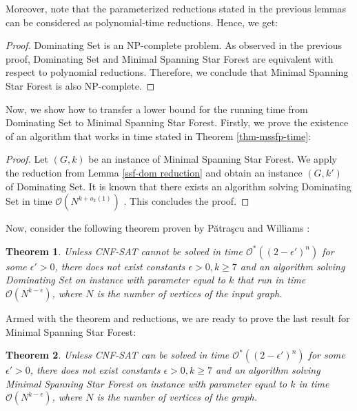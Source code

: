 \documentclass[en]{pracamgr}
\newtheorem{theorem}{Theorem}
\theoremstyle{definition}
\newcommand{\mssfp}{{\sc Minimal Spanning Star Forest}}
\newcommand{\domsetp}{{\sc Dominating Set}}
\newcommand{\cnfsat}{{\sc CNF-SAT}}
\begin{document}
Moreover, note that the parameterized reductions stated in the previous lemmas can be considered as polynomial-time reductions. Hence, we get:

\thmmssfpnpc*

\begin{proof}
	\domsetp{} is an NP-complete problem. As observed in the previous proof, \domsetp{} and \mssfp{} are equivalent with respect to polynomial reductions. Therefore, we conclude that \mssfp{} is  also NP-complete.
\end{proof}

Now, we show how to transfer a lower bound for the running time from \domsetp{} to \mssfp{}. Firstly, we prove the existence of an algorithm that works in time stated in Theorem \ref{thm-mssfp-time}:

\thmmssfptime*

\begin{proof}
	Let $(G,k)$ be an instance of \mssfp{}. We apply the reduction from Lemma \ref{ssf-dom reduction} and obtain an instance $(G,k')$ of \domsetp{}. It is known that there exists an algorithm solving \domsetp{} in time $\mathcal{O}(N^{k + o_k(1)})$ \cite{DomSetAlg}. This concludes the proof.
\end{proof}

Now, consider the following theorem proven by Pătraşcu and Williams \cite{DomSet}:

\begin{theorem}\label{domset-seth}
	Unless \cnfsat{} cannot be solved in time $\mathcal{O}^*((2-\epsilon')^n)$ for some $\epsilon' > 0$, there does not exist constants $\epsilon > 0, k \geq 7$ and an algorithm solving \domsetp{} on instance with parameter equal to $k$ that run in time $\mathcal{O}(N^{k-\epsilon})$, where $N$ is the number of vertices of the input graph.
\end{theorem}

Armed with the theorem and reductions, we are ready to prove the last result for \mssfp{}:

\begingroup
\renewcommand\thetheorem{1.5}
\begin{theorem}
	Unless \cnfsat{} can be solved in time $\mathcal{O}^*((2-\epsilon')^n)$
	for some $\epsilon' > 0$, there does not exist constants $\epsilon > 0,k\geq 7$ and an algorithm solving \mssfp{} on instance with parameter equal to $k$ in time $\mathcal{O}(N^{k-\epsilon})$, where $N$ is the number of vertices of the graph.
\end{theorem}
\endgroup
\end{document}
